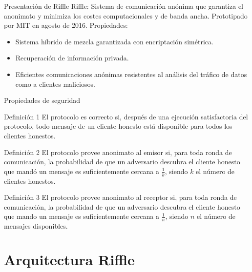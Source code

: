 \documentclass[10pt]{beamer}
\begin{document}
\begin{frame}[fragile]{Presentación de Riffle}
	\pause
	Riffle: Sistema de comunicación anónima que garantiza el anonimato y minimiza los costes computacionales y de banda ancha. Prototipado por MIT en agosto de 2016. Propiedades: \pause
	\begin{itemize}
		\item<1-> Sistema híbrido de mezcla garantizada con encriptación simétrica. \pause
		\item<2-> Recuperación de información privada. \pause
		\item<3-> Eficientes comunicaciones anónimas resistentes al análisis del tráfico de datos como a clientes maliciosos. \pause
	\end{itemize}
\end{frame}

\begin{frame}[fragile]{Propiedades de seguridad}
	\pause
	\begin{block}{Definición 1}
		El protocolo es correcto si, después de una ejecución satisfactoria del protocolo,
		todo mensaje de un cliente honesto está
		disponible para todos los clientes honestos. \pause
	\end{block}	
	\begin{block}{Definición 2}
		El protocolo provee anonimato al emisor si, para toda ronda de comunicación, la probabilidad de que un adversario descubra el cliente honesto que mandó un mensaje es suficientemente cercana a $\frac{1}{k}$, siendo $k$ el número de clientes honestos. \pause
	\end{block}
	\begin{block}{Definición 3}
		El protocolo provee anonimato al receptor si, para toda ronda de comunicación, la probabilidad de que un adversario descubra el cliente honesto que mando un mensaje es suficientemente cercana a $\frac{1}{n}$, siendo $n$ el número de mensajes disponibles.
	\end{block}
\end{frame}	

\section{Arquitectura Riffle}
\end{document}
